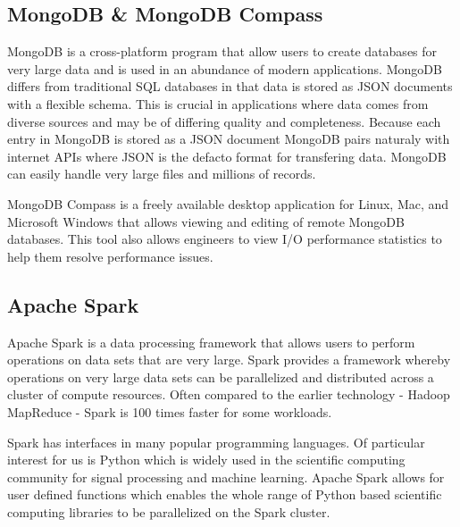 \documentclass[conference,twoside]{IEEEtran}
\begin{document}
\subsection{MongoDB \& MongoDB Compass}
MongoDB is a cross-platform program that allow users to create databases for very large data and is used in an abundance of modern applications. MongoDB differs from traditional SQL databases in that data is stored as JSON documents with a flexible schema. This is crucial in applications where data comes from diverse sources and may be of differing quality and completeness. Because each entry in MongoDB is stored as a JSON document MongoDB pairs naturaly with internet APIs where JSON is the defacto format for transfering data. MongoDB can easily handle very large files and millions of records\cite{mongodb}.

MongoDB Compass is a freely available desktop application for Linux, Mac, and Microsoft Windows that allows viewing and editing of remote MongoDB databases. This tool also allows engineers to view I/O performance statistics to help them resolve performance issues\cite{mongodbcompass}.

\subsection{Apache Spark}
Apache Spark is a data processing framework that allows users to perform operations on data sets that are very large. Spark provides a framework whereby operations on very large data sets can be parallelized and distributed across a cluster of compute resources. Often compared to the earlier technology - Hadoop MapReduce - Spark is 100 times faster for some workloads.

Spark has interfaces in many popular programming languages. Of particular interest for us is Python which is widely used in the scientific computing community for signal processing and machine learning. Apache Spark allows for user defined functions which enables the whole range of Python based scientific computing libraries to be parallelized on the Spark cluster\cite{spark}.
\end{document}
